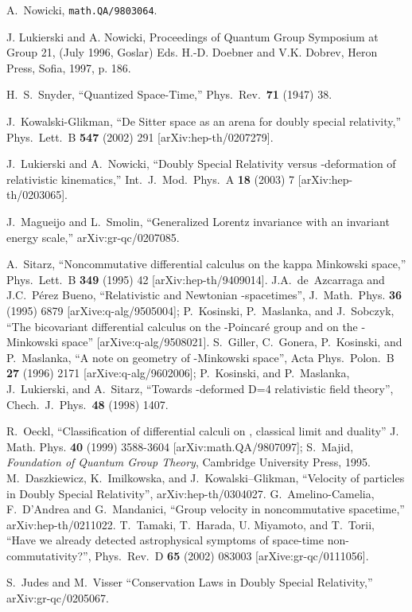 \documentclass  [12pt] {article}
\begin{document}
\begin{thebibliography}{99}
  A.~Nowicki, {\tt math.QA/9803064}.

 J. Lukierski and A. Nowicki, Proceedings of
Quantum Group Symposium at Group 21, (July 1996, Goslar) Eds. H.-D. Doebner and
V.K. Dobrev, Heron Press, Sofia, 1997, p. 186.

 H.~S.~Snyder,
``Quantized Space-Time,'' Phys.\ Rev.\  {\bf 71} (1947) 38.

J.~Kowalski-Glikman, ``De Sitter space as an arena for doubly special
relativity,'' Phys.\ Lett.\ B {\bf 547} (2002) 291 [arXiv:hep-th/0207279].

 J.~Lukierski and A.~Nowicki,
``Doubly Special Relativity versus \myHighlight{$\kappa$}\coordHE{}-deformation of
relativistic kinematics,'' Int.\ J.\ Mod.\ Phys.\ A {\bf 18}
(2003) 7 [arXiv:hep-th/0203065].




J.~Magueijo and L.~Smolin, ``Generalized Lorentz invariance with an invariant
energy scale,'' arXiv:gr-qc/0207085.




 A.~Sitarz, ``Noncommutative differential calculus on the kappa
Minkowski space,'' Phys.\ Lett.\ B {\bf 349} (1995) 42 [arXiv:hep-th/9409014].
 J.A.~de~Azcarraga and J.C.~P\'erez Bueno, ``Relativistic and Newtonian
\myHighlight{$\kappa$}\coordHE{}-spacetimes'', J.~Math.~Phys. {\bf 36} (1995) 6879
[arXive:q-alg/9505004]; P.~Kosinski, P.~Maslanka, and J.~Sobczyk, ``The
bicovariant differential calculus on the \myHighlight{$\kappa$}\coordHE{}-Poincar\'e group and on the
\myHighlight{$\kappa$}\coordHE{}-Minkowski space'' [arXive:q-alg/9508021].
 S.~Giller, C.~Gonera,
P.~Kosinski, and P.~Maslanka, ``A note on geometry of \myHighlight{$\kappa$}\coordHE{}-Minkowski
space'', Acta Phys.\ Polon.\ B {\bf 27} (1996) 2171 [arXive:q-alg/9602006];
P.~Kosinski, and P.~Maslanka, J.~Lukierski, and A.~Sitarz, ``Towards
\myHighlight{$\kappa$}\coordHE{}-deformed D=4 relativistic field theory'', Chech.\ J.\ Phys.\ {\bf 48}
(1998) 1407.

 R.~Oeckl, ``Classification of differential calculi on \coordHE{}, classical limit and duality''
 J. Math. Phys. {\bf 40} (1999) 3588-3604  [arXiv:math.QA/9807097]; S.~Majid, {\em
Foundation of Quantum Group Theory}, Cambridge University Press, 1995.
 M.\ Daszkiewicz, K.\
Imilkowska, and J.\ Kowalski--Glikman, ``Velocity of particles in
Doubly Special Relativity'', arXiv:hep-th/0304027.
G.~Amelino-Camelia, F.~D'Andrea and G.~Mandanici, ``Group velocity in
noncommutative spacetime,'' arXiv:hep-th/0211022.
 T.\ Tamaki, T.\ Harada, U. Miyamoto, and T.\ Torii,
``Have we already detected astrophysical symptoms of space-time
non-commutativity?'', Phys.\ Rev.\ D {\bf 65} (2002) 083003
[arXive:gr-qc/0111056].

S.~Judes and M.~Visser ``Conservation Laws in Doubly Special Relativity,''
arXiv:gr-qc/0205067.


\end{thebibliography}
\end{document}
